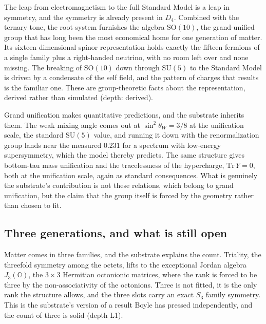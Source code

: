 The leap from electromagnetism to the full Standard Model is a leap in symmetry, and the symmetry is already present in $D_4$. Combined with the ternary tone, the root system furnishes the algebra $\mathrm{SO}(10)$, the grand-unified group that has long been the most economical home for one generation of matter. Its sixteen-dimensional spinor representation holds exactly the fifteen fermions of a single family plus a right-handed neutrino, with no room left over and none missing. The breaking of $\mathrm{SO}(10)$ down through $\mathrm{SU}(5)$ to the Standard Model is driven by a condensate of the self field, and the pattern of charges that results is the familiar one. These are group-theoretic facts about the representation, derived rather than simulated (depth: derived).

Grand unification makes quantitative predictions, and the substrate inherits them. The weak mixing angle comes out at $\sin^2\theta_W = 3/8$ at the unification scale, the standard $\mathrm{SU}(5)$ value, and running it down with the renormalization group lands near the measured $0.231$ for a spectrum with low-energy supersymmetry, which the model thereby predicts. The same structure gives bottom-tau mass unification and the tracelessness of the hypercharge, $\mathrm{Tr}\,Y = 0$, both at the unification scale, again as standard consequences. What is genuinely the substrate's contribution is not these relations, which belong to grand unification, but the claim that the group itself is forced by the geometry rather than chosen to fit.

\subsection{Three generations, and what is still open}

Matter comes in three families, and the substrate explains the count. Triality, the threefold symmetry among the octets, lifts to the exceptional Jordan algebra $J_3(\mathbb{O})$, the $3 \times 3$ Hermitian octonionic matrices, where the rank is forced to be three by the non-associativity of the octonions. Three is not fitted, it is the only rank the structure allows, and the three slots carry an exact $S_3$ family symmetry. This is the substrate's version of a result Boyle has pressed independently, and the count of three is solid (depth L1).

